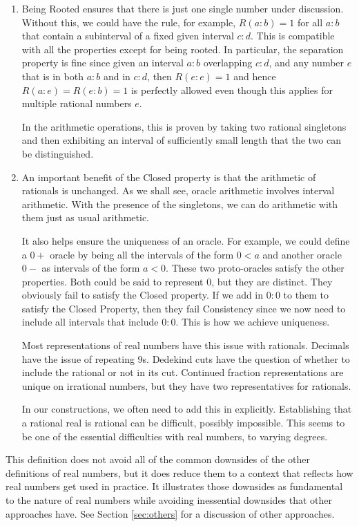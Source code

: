 \documentclass[12pt]{article}
\theoremstyle{remark}
\begin{document}
\begin{enumerate}
    \item Being Rooted ensures that there is just one single number under discussion. Without this, we could have the rule, for example, $R(a:b) = 1$ for all $a:b$ that contain a subinterval of a fixed given interval $c:d$. This is compatible with all the properties except for being rooted. In particular, the separation property is fine since given an interval $a:b$ overlapping  $c:d$, and any number $e$ that is in both $a:b$ and in $c:d$, then $R(e:e) = 1$ and hence $R(a:e)=R(e:b) = 1$ is perfectly allowed even though this applies for multiple rational numbers $e$.
    
    In the arithmetic operations, this is proven by taking two rational singletons and then exhibiting an interval of sufficiently small length that the two can be distinguished. 

    \item An important benefit of the Closed property is that the arithmetic of rationals is unchanged. As we shall see, oracle arithmetic involves interval arithmetic. With the presence of the singletons, we can do arithmetic with them just as usual arithmetic.
    
    It also helps ensure the uniqueness of an oracle. For example, we could define a $0+$ oracle by being all the intervals of the form $0\lt a$ and another oracle $0-$ as intervals of the form $a \lt 0$. These two proto-oracles satisfy the other properties. Both could be said to represent $0$, but they are distinct. They obviously fail to satisfy the Closed property. If we add in $0:0$ to them to satisfy the Closed Property, then they fail Consistency since we now need to include all intervals that include $0:0$. This is how we achieve uniqueness. 
    
    Most representations of real numbers have this issue with rationals. Decimals have the issue of repeating 9s. Dedekind cuts have the question of whether to include the rational or not in its cut. Continued fraction representations are unique on irrational numbers, but they have two representatives for rationals. 
    
    In our constructions, we often need to add this in explicitly. Establishing that a rational real is rational can be difficult, possibly impossible. This seems to be one of the essential difficulties with real numbers, to varying degrees.

\end{enumerate}


This definition does not avoid all of the common downsides of the other definitions of real numbers, but it does reduce them to a context that reflects how real numbers get used in practice. It illustrates those downsides as fundamental to the nature of real numbers while avoiding inessential downsides that other approaches have. See Section \ref{sec:others} for a discussion of other approaches.  
\end{document}
